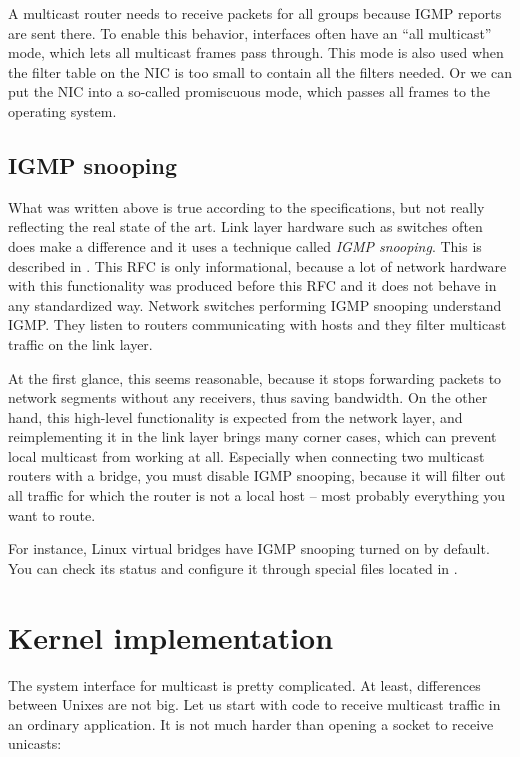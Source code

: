 A multicast router needs to receive packets for all groups because IGMP reports
are sent there. To enable this behavior, interfaces often have an ``all multicast''
mode, which lets all multicast frames pass through. This mode is also used when
the filter table on the NIC is too small to contain all the filters needed. Or
we can put the NIC into a so-called promiscuous mode, which passes all frames
to the operating system.

\subsection{IGMP snooping}

What was written above is true according to the specifications, but not really
reflecting the real state of the art. Link layer hardware such as switches often does
make a difference and it uses a technique called \emph{IGMP snooping}. This is described
in . This RFC is only informational, because a lot of network hardware with
this functionality was produced before this RFC and it does not behave in any
standardized way. Network switches performing IGMP snooping understand IGMP. They
listen to routers communicating with hosts and they filter multicast traffic on
the link layer.

At the first glance, this seems reasonable, because it stops forwarding packets
to network segments without any receivers, thus saving bandwidth. On the other
hand, this high-level functionality is expected from the network layer, and
reimplementing it in the link layer brings many corner cases, which can prevent
local multicast from working at all. Especially when connecting two multicast
routers with a bridge, you must disable IGMP snooping, because it will filter
out all traffic for which the router is not a local host -- most probably
everything you want to route.

For instance, Linux virtual bridges have IGMP snooping turned on by default.
You can check its status and configure it through special files located in
.

\def\setsockopt{\ttt{set\-sock\-opt} }
\section{Kernel implementation}

The system interface for multicast is pretty complicated. At least, differences
between Unixes are not big. Let us start with code to receive multicast traffic
in an ordinary application. It is not much harder than opening a socket to
receive unicasts:

